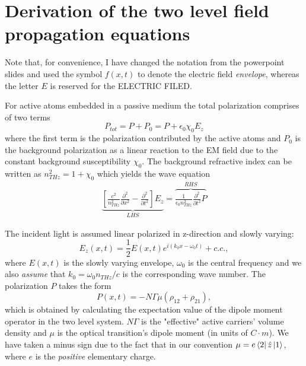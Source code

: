 \documentclass[preprint,secnumarabic,amssymb, nobibnotes, aip, prd]{revtex4-1}
\def\p{\partial}
\begin{document}
\section{Derivation of the two level field propagation equations}

Note that, for convenience,  I have changed the notation from the powerpoint slides and used the symbol $f(x,t)$ to denote the electric field \emph{envelope}, whereas the letter $E$ is reserved for the ELECTRIC FILED.


For active atoms embedded in a passive medium the total polarization comprises of two terms
\begin{equation}
P_{tot} = P+P_0 = P+\epsilon_0\chi_0E_z
\end{equation}
where the first term is the polarization contributed by the active atoms and $P_0$ is the background polarization as a linear reaction to the EM field due to the constant background susceptibility $\chi_0$. The background refractive index can be written as 
$n_{THz}^2 = 1+\chi_0$ which yields the wave equation 
\begin{align}
\label{eq:waveqn}
\underbrace{\left [\frac{c^2}{n_{THz}^2} \frac{\p^2}{\p x^2} -\frac{\p^2}{\p t^2} \right ] E_z}_{LHS} =\overbrace{\frac{1}{\epsilon_0 n_{THz}^2}\frac{\p^2}{\p t^2}P}^{RHS}  
\end{align}

The incident light is assumed linear polarized in z-direction and slowly varying:
\begin{equation}
\label{eq:ringansatz-field}
E_z(x,t) =\frac{1}{2}E(x,t)e^{i(k_0x-\omega_0t)}+c.c.,  
\end{equation}
where $E(x,t)$ is the slowly varying envelope, $\omega_0$ is the central frequency and we also \emph{assume} that $k_0=\omega_0 n_{THz}/c$ is the corresponding wave number. 
The polarization $P$ takes the form 
\begin{equation}
P(x,t) =  -N\Gamma\mu (\rho_{12}+\rho_{21}),  
\end{equation}
which is obtained by calculating the expectation value of the dipole moment operator in the two level system. $N\Gamma$ is the 
"effective" active carriers' volume density and $\mu$ is the optical transition's dipole moment (in units of $C\cdot m$). We have taken a minus sign due to the fact that in our convention $\mu = e\bra{2}\hat{z}\ket{1}$, where $e$ is the \emph{positive} elementary charge. 
\end{document}
